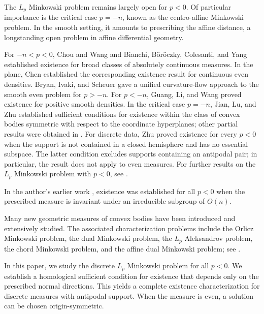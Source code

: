 \documentclass[12pt,reqno]{amsart}
\numberwithin{equation}{section}
\theoremstyle{remark}
\begin{document}
The $L_p$ Minkowski problem remains largely open for $p<0$.
Of particular importance is the critical case $p=-n$, known as
the centro-affine Minkowski problem. In the smooth setting,
it amounts to prescribing the affine distance, a longstanding
open problem in affine differential geometry.


For $-n<p<0$, Chou and Wang \cite{ChouWang} and
Bianchi, B\"or\"oczky, Colesanti, and Yang
\cite{BianchiBoroczkyColesantiYang} established existence
for broad classes of absolutely continuous measures.
In the plane, Chen \cite{ChenPlanar} established the corresponding
existence result for continuous even densities.
Bryan, Ivaki, and Scheuer \cite{BryanIvakiScheuer} gave a
unified curvature-flow approach to the smooth even problem
for $p>-n$.
For $p<-n$, Guang, Li, and Wang \cite{GuangLiWang}
proved existence for positive smooth densities.
In the critical case $p=-n$, Jian, Lu, and Zhu
\cite{JianLuZhu} established sufficient conditions for
existence within the class of convex bodies symmetric
with respect to the coordinate hyperplanes;
other partial results were obtained in
\cite{GuangLiWangCentro,JianLuWang,LiCentroAffineMultiplicity,LuWang}.
For discrete data, Zhu \cite{ZhuCentroAffine,ZhuNegative} proved existence for
every $p<0$ when the support is not contained in a closed
hemisphere and has no essential subspace.
The latter condition excludes supports containing an antipodal
pair; in particular, the result does not apply to  even
 measures.
For further results on the $L_p$ Minkowski problem with $p<0$,
see \cite{BianchiBoroczkyColesantiSmooth,
	DouZhu,DuPlanar,JianLuWangNonuniqueness,MilmanIsospectral}.






In the author's earlier work \cite{ShanGroup}, existence was
established for all $p<0$ when the prescribed measure is invariant
under an irreducible subgroup of $O(n)$.

Many new geometric measures of convex bodies have been introduced
and extensively studied. The associated characterization problems
include the Orlicz Minkowski problem, the dual Minkowski problem,
the $L_p$ Aleksandrov problem, the chord Minkowski problem,
and the affine dual Minkowski problem; see
\cite{CaiLengWuXiAffineDual,HaberlLutwakYangZhang,HuangLutwakYangZhangDual,%
	HuangLutwakYangZhangAleksandrov,HuangYangZhangSurvey,LutwakXiYangZhangChord}.

In this paper, we study the discrete $L_p$ Minkowski problem for
all $p<0$. We establish a homological sufficient condition for
existence that depends only on the prescribed normal directions.
This yields a complete existence characterization for discrete
measures with antipodal support. When the measure is even, a solution can be chosen
origin-symmetric.
\end{document}
